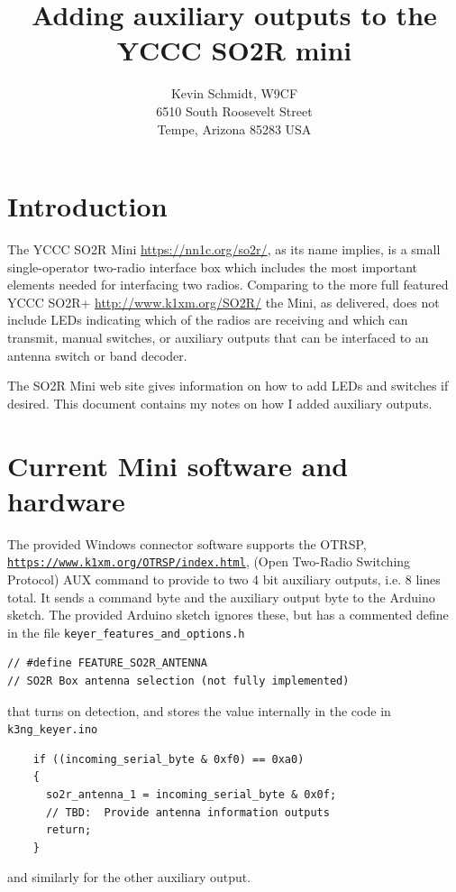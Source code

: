 \documentclass[12pt]{article}
\begin{document}
\title{
Adding auxiliary outputs to the YCCC SO2R mini
}
\author{
Kevin Schmidt, W9CF\\
6510 South Roosevelt Street\\
Tempe, Arizona 85283 USA\\
}
\date{}
\maketitle

\section{Introduction}
The YCCC SO2R Mini
\href{https://nn1c.org/so2r/}{https://nn1c.org/so2r/},
as its name implies, is
a small single-operator two-radio interface box which includes the
most important elements needed for interfacing two radios.
Comparing to the more full featured YCCC SO2R+
\href{http://www.k1xm.org/SO2R/}{http://www.k1xm.org/SO2R/}
the Mini, as delivered, does not include LEDs indicating which of the radios
are receiving and which can transmit, manual switches, or auxiliary outputs
that can be interfaced to an antenna switch or band decoder.

The SO2R Mini web site gives information on how to add LEDs and switches
if desired. This document contains my notes on how I added auxiliary
outputs.

\section{Current Mini software and hardware}
The provided Windows connector software supports the OTRSP,
\href{https://www.k1xm.org/OTRSP/index.html}
{\nolinkurl{https://www.k1xm.org/OTRSP/index.html}},
(Open Two-Radio Switching Protocol)
AUX command to provide to two 4 bit auxiliary outputs, i.e. 8 lines total.
It sends a command byte and the auxiliary output byte to the Arduino sketch.
The provided Arduino sketch ignores these, but has a commented define
in the file \verb|keyer_features_and_options.h|
\begin{verbatim}
// #define FEATURE_SO2R_ANTENNA
// SO2R Box antenna selection (not fully implemented)
\end{verbatim}
that turns on detection, and stores the value internally in the code
in \verb|k3ng_keyer.ino|
\begin{verbatim}
    if ((incoming_serial_byte & 0xf0) == 0xa0)
    {
      so2r_antenna_1 = incoming_serial_byte & 0x0f;
      // TBD:  Provide antenna information outputs
      return;
    }
\end{verbatim}
and similarly for the other auxiliary output.
\end{document}
